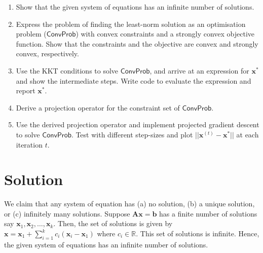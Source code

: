 \documentclass[12pt,a4paper]{article}
\newcommand{\R}{\mathbb{R}}
\theoremstyle{remark}
\begin{document}
\begin{enumerate}
    \item Show that the given system of equations has an infinite number of solutions.
    \item Express the problem of finding the least-norm solution as an optimisation problem ($\mathsf{ConvProb}$) with convex constraints and a strongly convex objective function. Show that the constraints and the objective are convex and strongly convex, respectively.
    \item Use the KKT conditions to solve $\mathsf{ConvProb}$, and arrive at an expression for $\mathbf{x}^*$ and show the intermediate steps. Write code to evaluate the expression and report $\mathbf{x}^*$.
    \item Derive a projection operator for the constraint set of $\mathsf{ConvProb}$.
    \item Use the derived projection operator and implement projected gradient descent to solve $\mathsf{ConvProb}$. Test with different step-sizes and plot $||\mathbf{x}^{(t)} - \mathbf{x}^*||$ at each iteration $t$.
\end{enumerate}

\section*{Solution}

We claim that any system of equation has (a) no solution, (b) a unique solution, or (c) infinitely many solutions. Suppose $\mathbf{Ax = b}$ has a finite number of solutions say $\mathbf{x}_1, \mathbf{x}_2, \ldots, \mathbf{x}_k$. Then, the set of solutions is given by $\mathbf{x} = \mathbf{x}_1 + \sum_{i = 1}^{k} c_i (\mathbf{x}_i - \mathbf{x}_1)$ where $c_i \in \R$. This set of solutions is infinite. Hence, the given system of equations has an infinite number of solutions.
\end{document}
